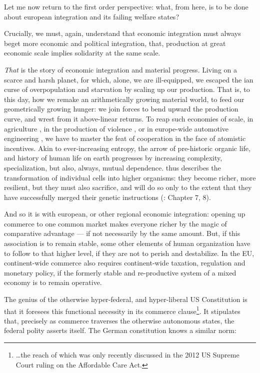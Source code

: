 \documentclass[11pt,a4paper,oneside,openright]{article}
\begin{document}
Let me now return to the first order perspective: 
what, from here, is to be done about european integration and its failing welfare states?

Crucially, we must, again, understand that economic integration must always beget more economic and political integration, that, production at great economic scale implies solidarity at the same scale.

\emph{That} is the story of economic integration and material progress. 
Living on a scarce and harsh planet, for which, alone, we are ill-equipped, we escaped the \citeauthor{Malthus1798}ian curse of overpopulation and starvation by scaling up our production. 
That is, to this day, how we remake an arithmetically growing material world, to feed our geometrically growing hunger: 
we join forces to bend upward the production curve, and wrest from it above-linear returns. 
To reap such economies of scale, in agriculture \citep{Diamond1997}, in the production of violence \citep{Tilly-1985-aa}, or in europe-wide automotive engineering \citep{Krugman-1980-aa}, we have to master the feat of cooperation in the face of atomistic incentives. 
Akin to ever-increasing entropy, the arrow of pre-historic organic life, and history of human life on earth progresses by increasing complexity, specialization, but also, always, mutual dependence. 
\citeauthor{Wright1994} thus describes the transformation of individual cells into higher organisms: 
they become richer, more resilient, but they must also sacrifice, and will do so only to the extent that they have successfully merged their genetic instructions (\citeyear{Wright1994}: Chapter 7, 8). 

And so it is with european, or other regional economic integration: 
opening up commerce to one common market makes everyone richer by the magic of comparative advantage --- if not necessarily by the same amount. 
But, if this association is to remain stable, some other elements of human organization have to follow to that higher level, if they are not to perish and destabilize. 
In the \gls{EU}, continent-wide commerce also requires continent-wide taxation, regulation and monetary policy, if the formerly stable and re-productive system of a mixed economy is to remain operative.

The genius of the otherwise hyper-federal, and hyper-liberal US Constitution is that it foresees this functional necessity in its commerce clause\footnote{
	\ldots the reach of which was only recently discussed in the 2012 US Supreme Court ruling on the Affordable Care Act.}.
It stipulates that, precisely as commerce traverses the otherwise autonomous states, the federal polity asserts itself. 
The German constitution knows a similar norm:
\end{document}
